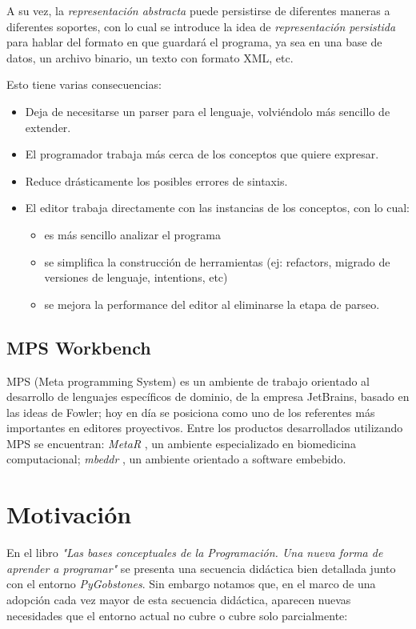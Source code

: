 A su vez, la \textit{representación abstracta} puede persistirse de diferentes maneras a diferentes soportes, con lo cual se introduce la idea de \textit{representación persistida} para hablar del formato en que guardará el programa, ya sea en una base de datos, un archivo binario, un texto con formato XML, etc.


Esto tiene varias consecuencias:
\begin{itemize}
  \item Deja de necesitarse un parser para el lenguaje, volviéndolo más sencillo de extender.
  \item El programador trabaja más cerca de los conceptos que quiere expresar.
  \item Reduce drásticamente los posibles errores de sintaxis.
  \item El editor trabaja directamente con las instancias de los conceptos, con lo cual:
  \begin{itemize}
    \item es más sencillo analizar el programa
    \item se simplifica la construcción de herramientas (ej: refactors, migrado de versiones de lenguaje, intentions, etc)
    \item se mejora la performance del editor al eliminarse la etapa de parseo.
  \end{itemize}
\end{itemize}


\subsection{MPS Workbench}

MPS (Meta programming System)\cite{MPS} es un ambiente de trabajo orientado al desarrollo de lenguajes específicos de dominio, de la empresa JetBrains, basado en las ideas de Fowler; hoy en día se posiciona como uno de los referentes más importantes en editores proyectivos\cite{LanguageModularity}. 
Entre los productos desarrollados utilizando MPS se encuentran: \textit{MetaR} \cite{MetaR}, un ambiente especializado en biomedicina computacional; \textit{mbeddr} \cite{mbeddr}, un ambiente orientado a software embebido.

\section{Motivación}

En el libro \textit{"Las bases conceptuales de la Programación. Una nueva forma de aprender a programar"}\cite{Gobstones} se presenta una secuencia didáctica bien detallada junto con el entorno \textit{PyGobstones}\cite{PyGobstones}. Sin embargo notamos que, en el marco de una adopción cada vez mayor de esta secuencia didáctica, aparecen nuevas necesidades que el entorno actual no cubre o cubre solo parcialmente:

